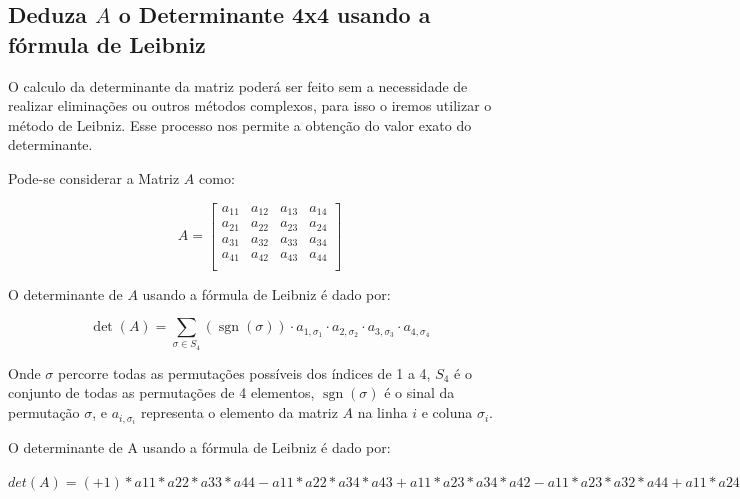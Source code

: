 \begin{center}
\section{\Large Deduza $A$ o Determinante 4x4 usando a fórmula de Leibniz}
\end{center}


O calculo da determinante da matriz poderá ser feito sem a necessidade de realizar eliminações ou outros métodos complexos, para isso o iremos utilizar o método de Leibniz. Esse processo nos permite a obtenção do valor exato do determinante.

\onehalfspacing
Pode-se considerar a Matriz $A$ como:

\[
A = \begin{bmatrix}
a_{11} & a_{12} & a_{13} & a_{14} \\
a_{21} & a_{22} & a_{23} & a_{24} \\
a_{31} & a_{32} & a_{33} & a_{34} \\
a_{41} & a_{42} & a_{43} & a_{44} \\
\end{bmatrix}
\]

\onehalfspacing
\begin{center}
O determinante de $A$ usando a fórmula de Leibniz é dado por:
\end{center}

\[
\det(A) = \sum_{\sigma \in S_4} (\operatorname{sgn}(\sigma)) \cdot a_{1,\sigma_1} \cdot a_{2,\sigma_2} \cdot a_{3,\sigma_3} \cdot a_{4,\sigma_4}
\]

Onde $\sigma$ percorre todas as permutações possíveis dos índices de 1 a 4, $S_4$ é o conjunto de todas as permutações de 4 elementos, $\operatorname{sgn}(\sigma)$ é o sinal da permutação $\sigma$, e $a_{i,\sigma_i}$ representa o elemento da matriz $A$ na linha $i$ e coluna $\sigma_i$.

\vspace{1cm}

O determinante de A usando a fórmula de Leibniz é dado por:

\begin{center}
$det(A) = (+1) * a11 * a22 * a33 * a44
- a11 * a22 * a34 * a43
+ a11 * a23 * a34 * a42
- a11 * a23 * a32 * a44
+ a11 * a24 * a32 * a43
- a11 * a24 * a33 * a42
- a12 * a21 * a33 * a44
+ a12 * a21 * a34 * a43
- a12 * a23 * a34 * a41
+ a12 * a23 * a31 * a44
- a12 * a24 * a31 * a43
+ a12 * a24 * a33 * a41
+ a13 * a21 * a32 * a44
- a13 * a21 * a34 * a42
+ a13 * a22 * a34 * a41
- a13 * a22 * a31 * a44
+ a13 * a24 * a31 * a42
- a13 * a24 * a32 * a41
- a14 * a21 * a32 * a43
+ a14 * a21 * a33 * a42$
\end{center}

